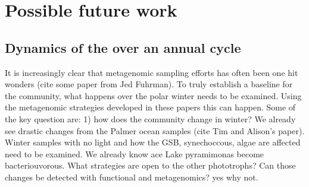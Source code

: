 
 


\section{Possible future work}
\subsection{Dynamics of the over an annual cycle}
It is increasingly clear that metagenomic sampling efforts has often been one hit wonders (cite some paper from Jed Fuhrman).
To truly establish a baseline for the community, what happens over the polar winter needs to be examined.
Using the metagenomic strategies developed in these papers this can happen.
Some of the key question are:
1) how does the community change in winter?
We already see drastic changes from the Palmer ocean samples (cite Tim and Alison's paper). 
Winter samples with no light and how the GSB, synechoccous, algae are affected need to be examined.
We already know ace Lake pyramimonas become bacteriouvorous. 
What strategies are open to the other phototrophs?
Can those changes be detected with functional and metagenomics? yes why not.

